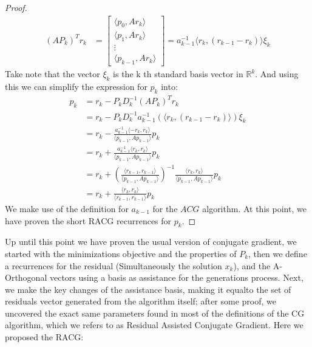 \documentclass[]{article}
\theoremstyle{definition}
\begin{document}
\begin{proof}
\begin{align}
                    (AP_k)^Tr_k &= 
                    \begin{bmatrix}
                        \langle p_0, Ar_k\rangle
                        \\
                        \langle p_1, Ar_k\rangle
                        \\
                        \vdots
                        \\
                        \langle p_{k - 1}, Ar_k\rangle
                    \end{bmatrix}
                    = 
                    a_{k - 1}^{-1}\langle r_k, (r_{k - 1} - r_{k})\rangle \xi_k
                \end{align}
                Take note that the vector $\xi_k$ is the k th standard basis vector in $\mathbb{R}^k$. And using this we can simplify the expression for $p_k$ into: 
                \begin{align}
                    p_k &= r_k - P_kD^{-1}_k(AP_k)^Tr_k
                    \\
                    &= r_k - P_kD_k^{-1}a_{k - 1}^{-1}(\langle r_k, (r_{k - 1} - r_{k})\rangle) \xi_k
                    \\
                    &= 
                    r_k - \frac{a_{k -1}^{-1}\langle -r_k, r_k\rangle}
                    {\langle p_{k - 1}, Ap_{k - 1}\rangle}p_k
                    \\
                    &= r_k + \frac{a_{k -1}^{-1}\langle r_k, r_k\rangle}
                    {\langle p_{k - 1}, Ap_{k - 1}\rangle}p_k
                    \\
                    &= r_k + 
                    \left(
                        \frac{\langle r_{k - 1}, r_{k - 1}\rangle}{\langle p_{k - 1}, Ap_{k - 1}\rangle}
                    \right)^{-1}
                    \frac{\langle r_k, r_k\rangle}{\langle p_{k - 1}, Ap_{k - 1}\rangle}p_k
                    \\
                    &= 
                    r_k + \frac{\langle r_k, r_k\rangle}{\langle r_{k - 1}, r_{k - 1}\rangle}p_k
                \end{align}
                We make use of the definition for $a_{k-1}$ for the $ACG$ algorithm. At this point, we have proven the short RACG recurrences for $p_k$. 
            \end{proof}
            Up until this point we have proven the usual version of conjugate gradient, we started with the minimizations objective and the properties of $P_k$, then we define a recurrences for the residual (Simultaneously the solution $x_k$), and the A-Orthogonal vectors using a basis as assistance for the generations process. Next, we make the key changes of the assistance basis, making it equalto the set of residuals vector generated from the algorithm itself; after some proof, we uncovered the exact same parameters found in most of the definitions of the CG algorithm, which we refers to as Residual Assisted Conjugate Gradient. Here we proposed the RACG: 
\end{document}
